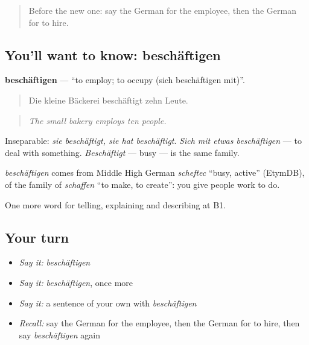 \label{lesson:GE-C350-beschaeftigen}



\begin{quote}
Before the new one: say the German for the employee, then the German for to hire.
\end{quote}

\subsection*{You'll want to know: beschäftigen}
\textbf{beschäftigen} — \textquotedblleft{}to employ; to occupy (sich beschäftigen mit)\textquotedblright{}.

\begin{quote}
Die kleine Bäckerei beschäftigt zehn Leute.
\end{quote}

\begin{quote}
\emph{The small bakery employs ten people.}
\end{quote}

Inseparable: \emph{sie beschäftigt, sie hat beschäftigt}. \emph{Sich mit etwas beschäftigen} — to deal with something. \emph{Beschäftigt} — busy — is the same family.

\begin{cousinweb}
\emph{beschäftigen} comes from Middle High German \emph{scheftec} \textquotedblleft{}busy, active\textquotedblright{} (EtymDB), of the family of \emph{schaffen} \textquotedblleft{}to make, to create\textquotedblright{}: you give people work to do.
\end{cousinweb}

\begin{grammarlens}[title={What you've built}]
One more word for telling, explaining and describing at B1.
\end{grammarlens}

\subsection*{Your turn}
\begin{itemize}
\raggedright
  \item \emph{Say it:} \emph{beschäftigen}
  \item \emph{Say it:} \emph{beschäftigen}, once more
  \item \emph{Say it:} a sentence of your own with \emph{beschäftigen}
  \item \emph{Recall:} say the German for the employee, then the German for to hire, then say \emph{beschäftigen} again
\end{itemize}

